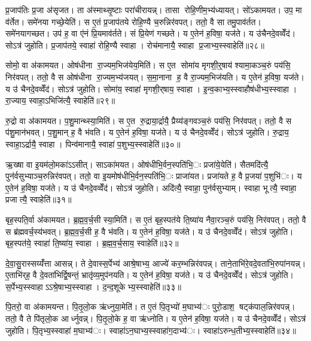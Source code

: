 प्र॒जाप॑तिः प्र॒जा अ॑सृजत। ता अ॑स्माथ्सृ॒ष्टाः परा॑चीरायन्न्। तासा रोहि॒णीम॒भ्य॑ध्यायत्। सो॑ऽकामयत। उप॒ मा व॑र्तेत। समे॑नया गच्छे॒येति॑। स ए॒तं प्र॒जाप॑तये रोहि॒ण्यै च॒रुन्निर॑वपत्। ततो॒ वै सा तमु॒पाव॑र्तत। समे॑नयागच्छत। उप॑ ह॒ वा ए॑नं प्रि॒यमाव॑र्तते। सं प्रि॒येण॑ गच्छते। य ए॒तेन॑ ह॒विषा॒ यज॑ते। य उ॑चैनदे॒वव्वेँद॑। सोऽत्र॑ जुहोति। प्र॒जाप॑तये॒ स्वाहा॑ रोहि॒ण्यै स्वाहा। रोच॑मानायै॒ स्वाहा प्र॒जाभ्य॒स्स्वाहेति॑॥२८॥

सोमो॒ वा अ॑कामयत। ओष॑धीना रा॒ज्यम॒भिज॑येय॒मिति॑। स ए॒त सोमा॑य मृगशी॒र्॒षाय॑ श्यामा॒कञ्च॒रुं पय॑सि॒ निर॑वपत्। ततो॒ वै स ओष॑धीना रा॒ज्यम॒भ्य॑जयत्। स॒मा॒नाना ह॒ वै रा॒ज्यम॒भिज॑यति। य ए॒तेन॑ ह॒विषा॒ यज॑ते। य उ॑ चैनदे॒वव्वेँद॑। सोऽत्र॑ जुहोति। सोमा॑य॒ स्वाहा॑ मृगशी॒र्‌षाय॒ स्वाहा। इ॒न्व॒काभ्य॒स्स्वाहौष॑धीभ्य॒स्स्वाहा। रा॒ज्याय॒ स्वाहा॒ऽभिजि॑त्यै॒ स्वाहेति॑॥२९॥

रु॒द्रो वा अ॑कामयत। प॒शु॒मान्थ्स्या॒मिति॑। स ए॒त रु॒द्राया॒र्द्रायै॒ प्रैय्य॑ङ्गवञ्च॒रुं पय॑सि॒ निर॑वपत्। ततो॒ वै स प॑शु॒मान॑भवत्। प॒शु॒मान् ह॒ वै भ॑वति। य ए॒तेन॑ ह॒विषा॒ यज॑ते। य उ॑ चैनदे॒वव्वेँद॑। सोऽत्र॑ जुहोति। रु॒द्राय॒ स्वाहा॒ऽर्द्रायै॒ स्वाहा। पिन्व॑मानायै॒ स्वाहा॑ प॒शुभ्य॒स्स्वाहेति॑॥३०॥

ऋ॒ख्षा वा इ॒यम॑लो॒मका॑ऽऽसीत्। साऽका॑मयत। ओष॑धीभि॒र्वन॒स्पति॑भि॒ः प्रजा॑ये॒येति॑। सैतमदि॑त्यै॒ पुन॑र्वसुभ्याञ्च॒रुन्निर॑वपत्। ततो॒ वा इ॒यमोष॑धीभि॒र्वन॒स्पति॑भि॒ः प्राजा॑यत। प्रजा॑यते ह॒ वै प्र॒जया॑ प॒शुभि॑ः। य ए॒तेन॑ ह॒विषा॒ यज॑ते। य उ॑ चैनदे॒वव्वेँद॑। सोऽत्र॑ जुहोति। अदि॑त्यै॒ स्वाहा॒ पुन॑र्वसुभ्याम्। स्वाहा भूत्यै॒ स्वाहा॒ प्रजात्यै॒ स्वाहेति॑॥३१॥

बृह॒स्पति॒र्वा अ॑कामयत। ब्र॒ह्म॒व॒र्च॒सी स्या॒मिति॑। स ए॒तं बृह॒स्पत॑ये ति॒ष्या॑य नैवा॒रञ्च॒रुं पय॑सि॒ निर॑वपत्। ततो॒ वै स ब्र॑ह्मवर्च॒स्य॑भवत्। ब्र॒ह्म॒व॒र्च॒सी ह॒ वै भ॑वति। य ए॒तेन॑ ह॒विषा॒ यज॑ते। य उ॑ चैनदे॒वव्वेँद॑। सोऽत्र॑ जुहोति। बृह॒स्पत॑ये॒ स्वाहा॑ ति॒ष्या॑य॒ स्वाहा। ब्र॒ह्म॒व॒र्च॒साय॒ स्वाहेति॑॥३२॥

दे॒वा॒सु॒रास्सय्यँ॑त्ता आसन्न्। ते दे॒वास्स॒र्पेभ्य॑ आश्रे॒षाभ्य॒ आज्ये॑ कर॒म्भन्निर॑वपन्न्। ताने॒ताभि॑रे॒वदे॒वता॑भि॒रुपा॑नयन्न्। ए॒ताभि॑र्‌ह॒ वै दे॒वता॑भिर्द्वि॒षन्तं॒ भ्रातृ॑व्य॒मुप॑नयति। य ए॒तेन॑ ह॒विषा॒ यज॑ते। य उ॑ चैनदे॒वव्वेँद॑। सोऽत्र॑ जुहोति। स॒र्पेभ्य॒स्स्वाहाऽऽश्रे॒षाभ्य॒स्स्वाहा। द॒न्द॒शूकेभ्य॒स्स्वाहेति॑॥३३॥

पि॒तरो॒ वा अ॑कामयन्त। पि॒तृ॒लो॒क ऋ॑ध्नुया॒मेति॑। त ए॒तं पि॒तृभ्यो॑ म॒घाभ्य॑ः पुरो॒डाश॒ षट्क॑पाल॒न्निर॑वपन्न्। ततो॒ वै ते पि॑तृलो॒क आर्ध्नुवन्न्। पि॒तृ॒लो॒के ह॒ वा ऋ॑ध्नोति। य ए॒तेन॑ ह॒विषा॒ यज॑ते। य उ॑ चैनदे॒वव्वेँद॑। सोऽत्र॑ जुहोति। पि॒तृभ्य॒स्स्वाहा॑ म॒घाभ्य॑ः। स्वाहा॑ऽन॒घाभ्य॒स्स्वाहा॑ग॒दाभ्य॑ः। स्वाहा॑ऽरुन्ध॒तीभ्य॒स्स्वाहेति॑॥३४॥


